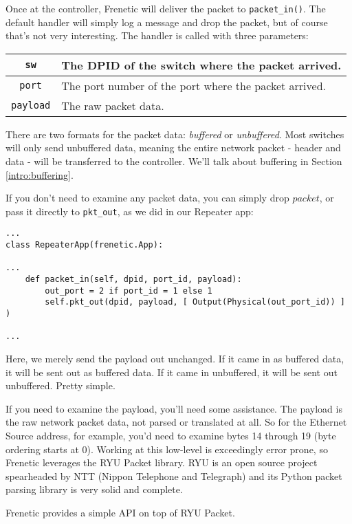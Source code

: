 Once at the controller, Frenetic will deliver the packet to \texttt{packet\_in()}. 
The default handler will simply log a message and drop the packet, but of course that's not very interesting.
The handler  is called with three parameters:

\bigskip
\begin{tabularx}{6in}{|c|X|}
\hline\hline
\texttt{sw} & The DPID of the switch where the packet arrived.
\\ \hline
\texttt{port} & The port number of the port where the packet arrived.
\\ \hline
\texttt{payload} & The raw packet data.
\\ \hline\hline
\end{tabularx}

\bigskip
There are two formats for the packet data: \emph{buffered} or \emph{unbuffered}.
Most switches will only send unbuffered data, meaning the entire network packet - header and data - will be 
transferred to the controller.
We'll talk about buffering in Section \ref{intro:buffering}.

If you don't need to examine any packet data, you can simply drop $packet$, or pass it directly to \texttt{pkt\_out},
as we did in our Repeater app:

\begin{verbatim}
...
class RepeaterApp(frenetic.App):

...
    def packet_in(self, dpid, port_id, payload):
        out_port = 2 if port_id = 1 else 1
        self.pkt_out(dpid, payload, [ Output(Physical(out_port_id)) ] )

...
\end{verbatim}

Here, we merely send the payload out unchanged.  
If it came in as buffered data, it will be sent out as buffered data.
If it came in unbuffered, it will be sent out unbuffered.  
Pretty simple.

If you need to examine the payload, you'll need some assistance.
The payload is the raw network packet data, not parsed or translated at all.
So for the Ethernet Source address, for example, you'd need to examine bytes 14 through 19 
(byte ordering starts at 0).  
Working at this low-level is exceedingly error prone, so Frenetic leverages the RYU Packet library.
RYU is an open source project spearheaded by NTT (Nippon Telephone and Telegraph) and its Python packet
parsing library is very solid and complete.

Frenetic provides a simple API on top of RYU Packet.

